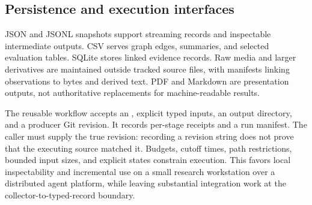 \subsection{Persistence and execution interfaces}
JSON and JSONL snapshots support streaming records and inspectable intermediate outputs. CSV serves graph edges, summaries, and selected evaluation tables. SQLite stores linked evidence records. Raw media and larger derivatives are maintained outside tracked source files, with manifests linking observations to bytes and derived text. PDF and Markdown are presentation outputs, not authoritative replacements for machine-readable results.

The reusable workflow accepts an , explicit typed inputs, an output directory, and a producer Git revision. It records per-stage receipts and a run manifest. The caller must supply the true revision: recording a revision string does not prove that the executing source matched it. Budgets, cutoff times, path restrictions, bounded input sizes, and explicit  states constrain execution. This favors local inspectability and incremental use on a small research workstation over a distributed agent platform, while leaving substantial integration work at the collector-to-typed-record boundary.
